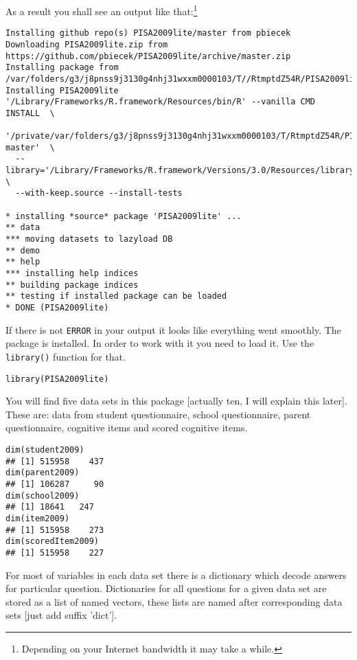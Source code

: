 As a result you shall see an output like that:\footnote{Depending on your Internet bandwidth it may take a while.}
\begin{shaded}\begin{verbatim}
Installing github repo(s) PISA2009lite/master from pbiecek
Downloading PISA2009lite.zip from https://github.com/pbiecek/PISA2009lite/archive/master.zip
Installing package from /var/folders/g3/j8pnss9j3130g4nhj31wxxm0000103/T//RtmptdZ54R/PISA2009lite.zip
Installing PISA2009lite
'/Library/Frameworks/R.framework/Resources/bin/R' --vanilla CMD INSTALL  \
  '/private/var/folders/g3/j8pnss9j3130g4nhj31wxxm0000103/T/RtmptdZ54R/PISA2009lite-master'  \
  --library='/Library/Frameworks/R.framework/Versions/3.0/Resources/library'  \
  --with-keep.source --install-tests 

* installing *source* package 'PISA2009lite' ...
** data
*** moving datasets to lazyload DB
** demo
** help
*** installing help indices
** building package indices
** testing if installed package can be loaded
* DONE (PISA2009lite)
\end{verbatim}\end{shaded}

If there is not \verb:ERROR: in your output it looks like everything went smoothly. The package is installed. In order to work with it you need to load it. Use the \verb:library(): function for that.
\begin{shaded}\begin{verbatim}
library(PISA2009lite)
\end{verbatim}\end{shaded}

You will find five data sets in this package [actually ten, I will explain this later]. These are: data from student questionnaire, school questionnaire, parent questionnaire, cognitive items and scored cognitive items.

\begin{shaded}\begin{verbatim}
dim(student2009)
## [1] 515958    437
dim(parent2009)
## [1] 106287     90
dim(school2009)
## [1] 18641   247
dim(item2009)
## [1] 515958    273
dim(scoredItem2009)
## [1] 515958    227
\end{verbatim}\end{shaded}

For most of variables in each data set there is a dictionary which decode answers for particular question. Dictionaries for all questions for a given data set are stored as a list of named vectors, these lists are named after corresponding data sets [just add suffix 'dict'].

